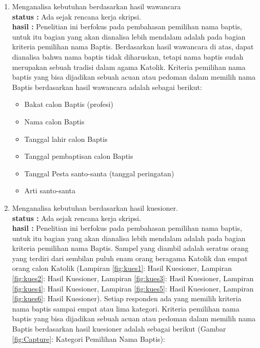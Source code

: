 \documentclass[a4paper,twoside]{article}
\begin{document}
\begin{enumerate}
\item Menganalisa kebutuhan berdasarkan hasil wawancara\\
		{\bf status :} Ada sejak rencana kerja skripsi.\\
		{\bf hasil :}	Penelitian ini berfokus pada pembahasan pemilihan nama baptis, untuk itu bagian yang akan dianalisa lebih mendalam adalah pada bagian kriteria pemilihan nama Baptis. Berdasarkan hasil wawancara di atas, dapat dianalisa bahwa nama baptis tidak diharuskan, tetapi nama baptis sudah merupakan sebuah tradisi dalam agama Katolik. Kriteria pemilihan nama baptis yang bisa dijadikan sebuah acuan atau pedoman dalam memilih nama Baptis berdasarkan hasil wawancara adalah sebagai berikut:
	

	\begin{itemize}
		\item Bakat calon Baptis (profesi)
		\item Nama calon Baptis
		\item Tanggal lahir calon Baptis
		\item Tanggal pembaptisan calon Baptis
		\item Tanggal Pesta santo-santa (tanggal peringatan)
		\item Arti santo-santa
	\end{itemize}
		

		\item Menganalisa kebutuhan berdasarkan hasil kuesioner.\\
		{\bf status :} Ada sejak rencana kerja skripsi.\\
		{\bf hasil :}	Penelitian ini berfokus pada pembahasan pemilihan nama baptis, untuk itu bagian yang akan dianalisa lebih mendalam adalah pada bagian kriteria pemilihan nama Baptis. Sampel yang diambil adalah seratus orang yang terdiri dari sembilan puluh enam orang beragama Katolik dan empat orang calon Katolik (Lampiran \ref{fig:kues1}: Hasil Kuesioner, Lampiran \ref{fig:kues2}: Hasil Kuesioner, Lampiran \ref{fig:kues3}: Hasil Kuesioner, Lampiran \ref{fig:kues4}: Hasil Kuesioner, Lampiran \ref{fig:kues5}: Hasil Kuesioner, Lampiran \ref{fig:kues6}: Hasil Kuesioner). Setiap responden ada yang memilih kriteria nama baptis sampai empat atau lima kategori. Kriteria pemilihan nama baptis yang bisa dijadikan sebuah acuan atau pedoman dalam memilih nama Baptis berdasarkan hasil kuesioner adalah sebagai berikut (Gambar \ref{fig:Capture}: Kategori Pemilihan Nama Baptis):
		

\end{enumerate}
\end{document}
